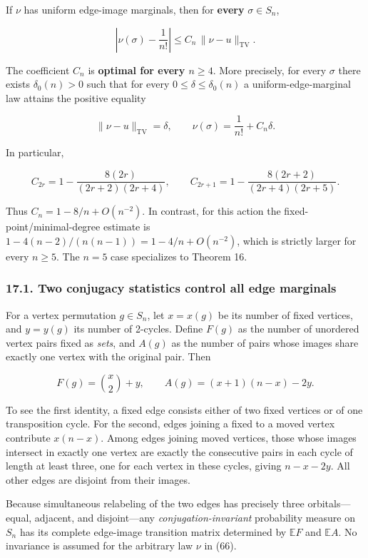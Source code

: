 \documentclass[
  11pt,
]{article}
\begin{document}
If \(\nu\) has uniform edge-image marginals, then for \textbf{every}
\(\sigma\in S_n\),

\[
\left|\nu(\sigma)-\frac1{n!}\right|
\le C_n\,\|\nu-u\|_{\mathrm{TV}}. \tag{66}
\]

The coefficient \(C_n\) is \textbf{optimal for every \(n\ge4\)}. More
precisely, for every \(\sigma\) there exists \(\delta_0(n)>0\) such that
for every \(0\le\delta\le\delta_0(n)\) a uniform-edge-marginal law
attains the positive equality

\[
\|\nu-u\|_{\mathrm{TV}}=\delta,\qquad
\nu(\sigma)=\frac1{n!}+C_n\delta. \tag{67}
\]

In particular,

\[
C_{2r}=1-\frac{8(2r)}{(2r+2)(2r+4)},\qquad
C_{2r+1}=1-\frac{8(2r+2)}{(2r+4)(2r+5)}.
\]

Thus \(C_n=1-8/n+O(n^{-2})\). In contrast, for this action the
fixed-point/minimal-degree estimate is
\(1-4(n-2)/(n(n-1))=1-4/n+O(n^{-2})\), which is strictly larger for
every \(n\ge5\). The \(n=5\) case specializes to Theorem 16.

\subsubsection{17.1. Two conjugacy statistics control all edge
marginals}\label{two-conjugacy-statistics-control-all-edge-marginals}

For a vertex permutation \(g\in S_n\), let \(x=x(g)\) be its number of
fixed vertices, and \(y=y(g)\) its number of 2-cycles. Define \(F(g)\)
as the number of unordered vertex pairs fixed as \emph{sets}, and
\(A(g)\) as the number of pairs whose images share exactly one vertex
with the original pair. Then

\[
F(g)=\binom x2+y,\qquad
A(g)=(x+1)(n-x)-2y. \tag{68}
\]

To see the first identity, a fixed edge consists either of two fixed
vertices or of one transposition cycle. For the second, edges joining a
fixed to a moved vertex contribute \(x(n-x)\). Among edges joining moved
vertices, those whose images intersect in exactly one vertex are exactly
the consecutive pairs in each cycle of length at least three, one for
each vertex in these cycles, giving \(n-x-2y\). All other edges are
disjoint from their images.

Because simultaneous relabeling of the two edges has precisely three
orbitals---equal, adjacent, and disjoint---any
\emph{conjugation-invariant} probability measure on \(S_n\) has its
complete edge-image transition matrix determined by \(\mathbb EF\) and
\(\mathbb EA\). No invariance is assumed for the arbitrary law \(\nu\)
in (66).
\end{document}
